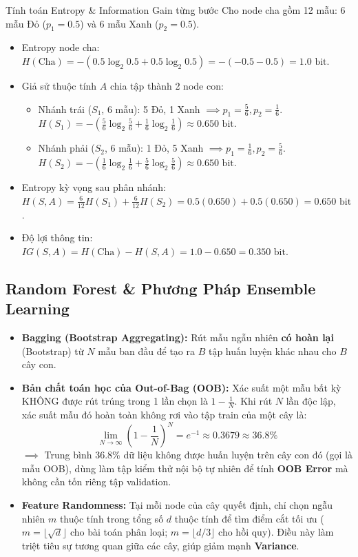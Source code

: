 \documentclass[10pt,a4paper]{article}
\begin{document}
\begin{examplebox}{Tính toán Entropy \& Information Gain từng bước}
Cho node cha gồm 12 mẫu: 6 mẫu Đỏ ($p_1 = 0.5$) và 6 mẫu Xanh ($p_2 = 0.5$).
\begin{itemize}[leftmargin=*]
    \item Entropy node cha: $H(\text{Cha}) = -(0.5 \log_2 0.5 + 0.5 \log_2 0.5) = -(-0.5 - 0.5) = 1.0\text{ bit}$.
    \item Giả sử thuộc tính $A$ chia tập thành 2 node con:
    \begin{itemize}
        \item Nhánh trái ($S_1$, 6 mẫu): 5 Đỏ, 1 Xanh $\implies p_1 = \frac{5}{6}, p_2 = \frac{1}{6}$.
        $H(S_1) = -(\frac{5}{6}\log_2 \frac{5}{6} + \frac{1}{6}\log_2 \frac{1}{6}) \approx 0.650\text{ bit}$.
        \item Nhánh phải ($S_2$, 6 mẫu): 1 Đỏ, 5 Xanh $\implies p_1 = \frac{1}{6}, p_2 = \frac{5}{6}$.
        $H(S_2) = -(\frac{1}{6}\log_2 \frac{1}{6} + \frac{5}{6}\log_2 \frac{5}{6}) \approx 0.650\text{ bit}$.
    \end{itemize}
    \item Entropy kỳ vọng sau phân nhánh:
    $H(S, A) = \frac{6}{12} H(S_1) + \frac{6}{12} H(S_2) = 0.5(0.650) + 0.5(0.650) = 0.650\text{ bit}$.
    \item Độ lợi thông tin: $IG(S, A) = H(\text{Cha}) - H(S, A) = 1.0 - 0.650 = 0.350\text{ bit}$.
\end{itemize}
\end{examplebox}

\subsection{Random Forest \& Phương Pháp Ensemble Learning}
\begin{itemize}[leftmargin=*]
    \item \textbf{Bagging (Bootstrap Aggregating):} Rút mẫu ngẫu nhiên \textbf{có hoàn lại} (Bootstrap) từ $N$ mẫu ban đầu để tạo ra $B$ tập huấn luyện khác nhau cho $B$ cây con.
    \item \textbf{Bản chất toán học của Out-of-Bag (OOB):} Xác suất một mẫu bất kỳ KHÔNG được rút trúng trong 1 lần chọn là $1 - \frac{1}{N}$. Khi rút $N$ lần độc lập, xác suất mẫu đó hoàn toàn không rơi vào tập train của một cây là:
    \begin{equation}
        \lim_{N \to \infty} \left(1 - \frac{1}{N}\right)^N = e^{-1} \approx 0.3679 \approx 36.8\%
    \end{equation}
    $\implies$ Trung bình $36.8\%$ dữ liệu không được huấn luyện trên cây con đó (gọi là mẫu OOB), dùng làm tập kiểm thử nội bộ tự nhiên để tính \textbf{OOB Error} mà không cần tốn riêng tập validation.
    \item \textbf{Feature Randomness:} Tại mỗi node của cây quyết định, chỉ chọn ngẫu nhiên $m$ thuộc tính trong tổng số $d$ thuộc tính để tìm điểm cắt tối ưu ($m = \lfloor \sqrt{d} \rfloor$ cho bài toán phân loại; $m = \lfloor d/3 \rfloor$ cho hồi quy). Điều này làm triệt tiêu sự tương quan giữa các cây, giúp giảm mạnh \textbf{Variance}.
\end{itemize}
\end{document}
